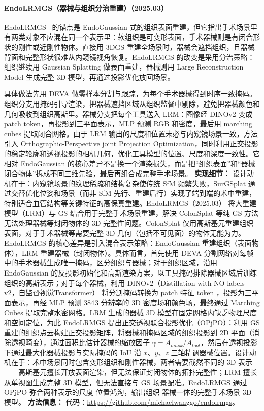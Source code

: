 \paragraph{EndoLRMGS（器械与组织分治重建）（2025.03）}
EndoLRMGS~\cite{2503_22437} 的锚点是 EndoGaussian 式的组织表面重建，但它指出手术场景里有两类对象不应混在同一个表示里：软组织是可变形表面，手术器械则是有闭合形状的刚性或近刚性物体。直接用 3DGS 重建全场景时，器械会遮挡组织，且器械背面和完整形状很难从内窥镜视角恢复。EndoLRMGS 的改变是采用分治策略：组织继续用 Gaussian Splatting 做表面重建，器械则用 Large Reconstruction Model 生成完整 3D 模型，再通过投影优化放回场景。

具体做法先用 DEVA 做零样本分割与跟踪，为每个手术器械得到时序一致掩码。组织分支用掩码引导渲染，把器械遮挡区域从组织监督中剔除，避免把器械颜色和几何吸收到组织高斯里。器械分支把每个工具送入 LRM：图像经 DINOv2 变成 patch token，再投影到三平面表示，MLP 预测 RGB 和密度，最后用 marching cubes 提取闭合网格。由于 LRM 输出的尺度和位置未必与内窥镜场景一致，方法引入 Orthographic-Perspective joint Projection Optimization，同时利用正交投影的稳定轮廓和透视投影的相机几何，优化工具模型的位置、尺度和深度一致性。它相对 EndoGaussian 的核心差异不是换一个渲染损失，而是把“组织表面”和“器械闭合物体”拆成不同三维先验，最后再组合成完整手术场景。
\textbf{实现细节：} 设计动机在于：内窥镜场景的纹理稀疏和结构复杂使传统 SfM 频繁失败，SurGSplat 通过交替优化位姿和场景（而非 SfM 先行、重建后行）实现了端到端的术中重建，特别适合血管结构等关键特征的高保真重建。EndoLRMGS（2025.03） 将大重建模型（LRM）与 GS 结合用于完整手术场景重建，解决 ColonSplat 等纯 GS 方法无法处理器械等封闭物体的 3D 完整性问题。ColonSplat 仅用高斯基元重建组织表面，对于手术器械等需要完整 3D 几何（包括不可见面）的物体无能为力。EndoLRMGS 的核心差异是引入混合表示策略：EndoGaussian 重建组织（表面物体），LRM 重建器械（封闭物体）。具体而言，首先使用 DEVA 分割网络对每帧中的手术器械生成唯一掩码，区分组织与器械；对于组织区域，沿用 EndoGaussian 的反投影初始化和高斯渲染方案，以工具掩码排除器械区域后训练组织的高斯表示；对于每个器械，利用 DINOv2（Distillation with NO labels v2，自监督视觉Transformer） 将分割掩码转换为 patch 特征 token ，投影为三平面表示，再经 MLP 预测 384$^{}3$ 分辨率的 3D 密度场和颜色场，最终通过 Marching Cubes 提取完整水密网格。LRM 生成的器械 3D 模型在固定网格内缺乏物理尺度和空间定位，为此 EndoLRMGS 提出正交透视联合投影优化（OPjPO）：利用 GS 重建的组织点云构建正交投影矩阵，将器械和掩码区域的组织投影到 2D 平面（消除透视畸变），通过面积比估计器械的缩放因子 $\gamma = A_{mask}/A_{tool}$，然后在透视投影下通过最大化器械投影与实际掩码的 IoU 沿 $x$、$y$、$z$ 三轴精调器械位置。设计动机在于：术中场景同时包含变形组织和刚性器械，两者需要截然不同的 3D 表示——高斯基元擅长开放表面渲染，但无法保证封闭物体的拓扑完整性；LRM 擅长从单视图生成完整 3D 模型，但无法直接与 GS 场景配准。EndoLRMGS 通过 OPjPO 弥合两种表示的尺度-位置鸿沟，输出组织-器械一体的完整手术场景 3D 模型。
\textbf{方法信息：} 代码：\url{https://github.com/michaelwanggo/endolrmgs}。



